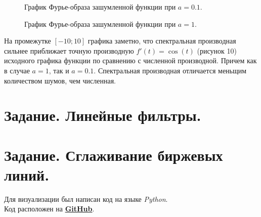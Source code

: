 \documentclass[a5paper, 10pt]{article}
\theoremstyle{definition}
\theoremstyle{plain}
\theoremstyle{remark}
\begin{document}
\begin{figure}[h!]
\caption{График Фурье-образа зашумленной функции при $a=0.1$.}
\caption{График Фурье-образа зашумленной функции при $a=1$.}
\end{figure}


На промежутке $[-10; 10]$ графика заметно, что спектральная производная сильнее приближает точную производную $f'(t) = \cos(t)$ (рисунок 10) исходного графика функции по сравнению с численной производной. Причем как в случае $a=1$, так и $a=0.1$. Спектральная производная отличается меньщим количеством шумов, чем численная.






\newpage
\section{Задание. Линейные фильтры.}







\newpage
\section{Задание. Сглаживание биржевых линий.}


\newpage
Для визуализации был написан код на языке \textit{Python}. \\
Код расположен на \href{https://github.com/a-nechaeva/practical_Linal/tree/main/lab4}{\textbf{GitHub}}.
\end{document}
